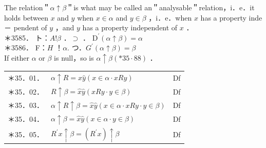 \documentclass[10pt]{article}
\begin{document}
The relation＂$\alpha \uparrow \beta$＂is what may be called an＂analysable＂relation，i．e．it holds between $x$ and $y$ when $x \in \alpha$ and $y \in \beta$ ，i．e．when $x$ has a property inde－ pendent of $y$ ，and $y$ has a property independent of $x$ ．\\
＊3585． ト：$A!\beta$ ．$\supset$ ． $\mathrm{D}^{\prime}(\alpha \uparrow \beta)=\alpha$\\
＊3586． F：$H$ ！$\alpha$. つ．$G^{\prime}(\alpha \uparrow \beta)=\beta$\\
If either $\alpha$ or $\beta$ is null，so is $\alpha \uparrow \beta(* 35 \cdot 88)$ ．

\begin{center}
\begin{tabular}{lll}
＊35．01． & $\alpha \uparrow R=\hat{x} \hat{y}(x \in \alpha \cdot x R y)$ & Df \\
＊35．02． & $R \uparrow \beta=\hat{x} \hat{y}(x R y \cdot y \in \beta)$ & Df \\
＊35．03． & $\alpha \uparrow R \uparrow \beta=\hat{x} \hat{y}(x \in \alpha \cdot x R y \cdot y \in \beta)$ & Df \\
＊35．04． & $\alpha \uparrow \beta=\hat{x} \hat{y}(x \in \alpha \cdot y \in \beta)$ & Df \\
＊35．05． & $R^{\prime} x \uparrow \beta=\left(R^{\prime} x\right) \uparrow \beta$ & Df \\
\end{tabular}
\end{center}
\end{document}
